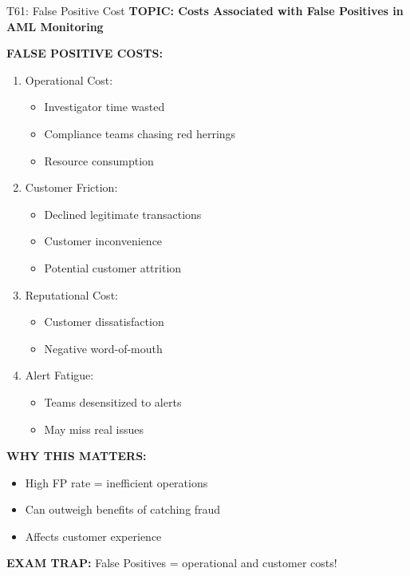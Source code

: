\documentclass[8pt]{beamer}
\begin{document}
	\begin{frame}{T61: False Positive Cost}
		\fontsize{6.5}{7.5}\selectfont
		\textbf{TOPIC: Costs Associated with False Positives in AML Monitoring}
		
		\vspace{0.1cm}
		\textbf{FALSE POSITIVE COSTS:}
		\begin{enumerate}
			\item \textcolor{myblue}{Operational Cost:}
			\begin{itemize}
				\item Investigator time wasted
				\item Compliance teams chasing red herrings
				\item Resource consumption
			\end{itemize}
			
			\item \textcolor{myblue}{Customer Friction:}
			\begin{itemize}
				\item Declined legitimate transactions
				\item Customer inconvenience
				\item Potential customer attrition
			\end{itemize}
			
			\item \textcolor{myblue}{Reputational Cost:}
			\begin{itemize}
				\item Customer dissatisfaction
				\item Negative word-of-mouth
			\end{itemize}
			
			\item \textcolor{myblue}{Alert Fatigue:}
			\begin{itemize}
				\item Teams desensitized to alerts
				\item May miss real issues
			\end{itemize}
		\end{enumerate}
		
		\vspace{0.1cm}
		\textbf{WHY THIS MATTERS:}
		\begin{itemize}
			\item High FP rate = inefficient operations
			\item Can outweigh benefits of catching fraud
			\item Affects customer experience
		\end{itemize}
		
		\textcolor{myred}{\textbf{EXAM TRAP:}} False Positives = \textcolor{myblue}{operational and customer costs}!
	\end{frame}
	
\end{document}
